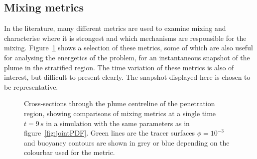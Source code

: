 \documentclass[a4paper]{article}
\begin{document}
\subsection{Mixing metrics}
\label{sec:mixing}

In the literature, many different metrics are used to examine mixing and characterise where it is strongest
and which mechanisms are responsible for the mixing. Figure~\ref{fig:mixing} shows a selection of these
metrics, some of which are also useful for analysing the energetics of the problem, for an instantaneous
snapshot of the plume in the stratified region. The time variation of these metrics is also of interest, but
difficult to present clearly. The snapshot displayed here is chosen to be representative.

\begin{figure}
	\centering
	\caption{Cross-sections through the plume centreline of the penetration region, showing comparisons of
	mixing metrics at a single time $t = 9 \, s$ in a simulation with the same parameters as in
	figure~\ref{fig:jointPDF}. Green lines are the tracer surfaces $ \phi = 10^{-3}$ and buoyancy contours are
	shown in grey or blue depending on the colourbar used for the metric. }
	\label{fig:mixing}
\end{figure}
\end{document}
